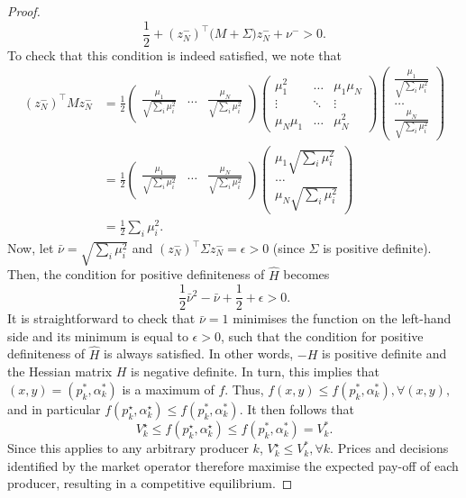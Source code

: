 \documentclass{article}
\begin{document}
\begin{proof}
\begin{equation*}
\frac{1}{2} + (z_N^-)^\top\big(M + \Sigma\big)z_N^- + \nu^- > 0.
\end{equation*}
To check that this condition is indeed satisfied, we note that
\begin{align*}
(z_N^-)^\top M z_N^- &= \frac{1}{2}\begin{pmatrix} \frac{\mu_1}{\sqrt{\sum_i \mu_i^2}} & \ldots & \frac{\mu_N}{\sqrt{\sum_i \mu_i^2}}\end{pmatrix} \begin{pmatrix} \mu_1^2 & \ldots & \mu_1 \mu_N \\ \vdots & \ddots & \vdots \\ \mu_N \mu_1 & \ldots & \mu_N^2 \end{pmatrix} \begin{pmatrix} \frac{\mu_1}{\sqrt{\sum_i \mu_i^2}} \\ \ldots \\ \frac{\mu_N}{\sqrt{\sum_i \mu_i^2}}\end{pmatrix}\\
&= \frac{1}{2} \begin{pmatrix} \frac{\mu_1}{\sqrt{\sum_i \mu_i^2}} & \ldots & \frac{\mu_N}{\sqrt{\sum_i \mu_i^2}}\end{pmatrix} \begin{pmatrix} \mu_1 \sqrt{\sum_i \mu_i^2} \\ \ldots \\ \mu_N \sqrt{\sum_i \mu_i^2} \end{pmatrix}\\
&= \frac{1}{2} \sum_i \mu_i^2.
\end{align*}
Now, let $\bar{\nu} = \sqrt{\sum_i \mu_i^2}$ and $(z_N^-)^\top \Sigma z_N^- = \epsilon > 0$ (since $\Sigma$ is positive definite). Then, the condition for positive definiteness of $\hat{H}$ becomes
\begin{equation*}
\frac{1}{2} \bar{\nu}^2 - \bar{\nu} + \frac{1}{2} + \epsilon > 0.
\end{equation*}
It is straightforward to check that $\bar{\nu} = 1$ minimises the function on the left-hand side and its minimum is equal to $\epsilon > 0$, such that the condition for positive definiteness of $\hat{H}$ is always satisfied. In other words, $-H$ is positive definite and the Hessian matrix $H$ is negative definite. In turn, this implies that $(x, y) = (p_k^*, \alpha_k^*)$ is a maximum of $f$. Thus, $f(x, y) \le f(p_k^*, \alpha_k^*), \forall (x, y),$ and in particular $ f(p_k^\star, \alpha_k^\star) \le f(p_k^*, \alpha_k^*)$. It then follows that
\begin{equation*}
V_k^\star \le f(p_k^\star, \alpha_k^\star) \le f(p_k^*, \alpha_k^*) = V_k^*.
\end{equation*}
Since this applies to any arbitrary producer $k$, $V_k^\star \le V_k^*, \forall k$. Prices and decisions identified by the market operator therefore maximise the expected pay-off of each producer, resulting in a competitive equilibrium.
\end{proof}
\end{document}
